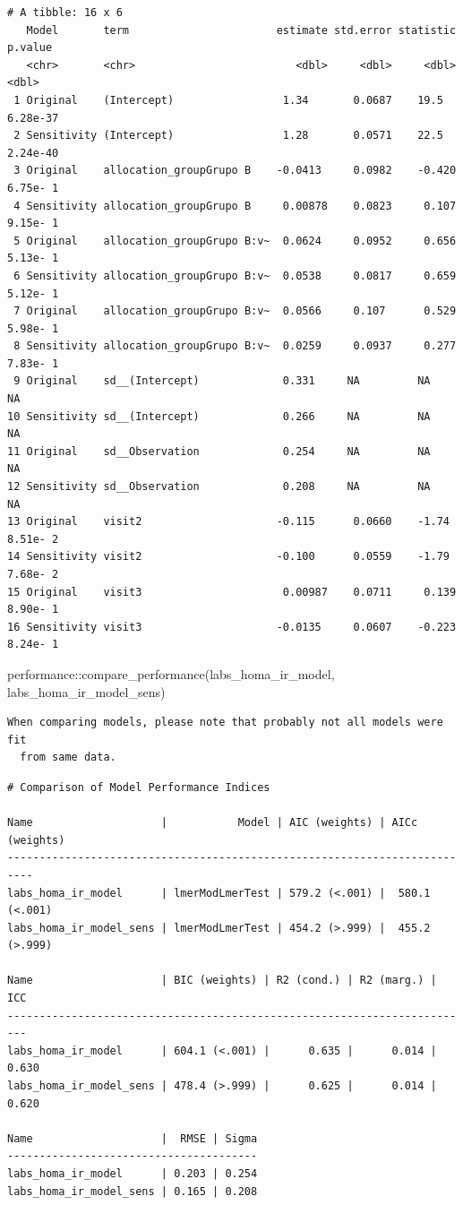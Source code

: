 \documentclass[
  letterpaper,
  DIV=11,
  numbers=noendperiod]{scrartcl}
\newenvironment{Shaded}{\begin{snugshade}}{\end{snugshade}}
\newcommand{\FunctionTok}[1]{\textcolor[rgb]{0.28,0.35,0.67}{#1}}
\newcommand{\NormalTok}[1]{\textcolor[rgb]{0.00,0.23,0.31}{#1}}
\newcommand{\SpecialCharTok}[1]{\textcolor[rgb]{0.37,0.37,0.37}{#1}}
\begin{document}
\begin{verbatim}
# A tibble: 16 x 6
   Model       term                       estimate std.error statistic   p.value
   <chr>       <chr>                         <dbl>     <dbl>     <dbl>     <dbl>
 1 Original    (Intercept)                 1.34       0.0687    19.5    6.28e-37
 2 Sensitivity (Intercept)                 1.28       0.0571    22.5    2.24e-40
 3 Original    allocation_groupGrupo B    -0.0413     0.0982    -0.420  6.75e- 1
 4 Sensitivity allocation_groupGrupo B     0.00878    0.0823     0.107  9.15e- 1
 5 Original    allocation_groupGrupo B:v~  0.0624     0.0952     0.656  5.13e- 1
 6 Sensitivity allocation_groupGrupo B:v~  0.0538     0.0817     0.659  5.12e- 1
 7 Original    allocation_groupGrupo B:v~  0.0566     0.107      0.529  5.98e- 1
 8 Sensitivity allocation_groupGrupo B:v~  0.0259     0.0937     0.277  7.83e- 1
 9 Original    sd__(Intercept)             0.331     NA         NA     NA       
10 Sensitivity sd__(Intercept)             0.266     NA         NA     NA       
11 Original    sd__Observation             0.254     NA         NA     NA       
12 Sensitivity sd__Observation             0.208     NA         NA     NA       
13 Original    visit2                     -0.115      0.0660    -1.74   8.51e- 2
14 Sensitivity visit2                     -0.100      0.0559    -1.79   7.68e- 2
15 Original    visit3                      0.00987    0.0711     0.139  8.90e- 1
16 Sensitivity visit3                     -0.0135     0.0607    -0.223  8.24e- 1
\end{verbatim}

\begin{Shaded}
\begin{Highlighting}[]
\NormalTok{performance}\SpecialCharTok{::}\FunctionTok{compare\_performance}\NormalTok{(labs\_homa\_ir\_model, labs\_homa\_ir\_model\_sens)}
\end{Highlighting}
\end{Shaded}

\begin{verbatim}
When comparing models, please note that probably not all models were fit
  from same data.
\end{verbatim}

\begin{verbatim}
# Comparison of Model Performance Indices

Name                    |           Model | AIC (weights) | AICc (weights)
--------------------------------------------------------------------------
labs_homa_ir_model      | lmerModLmerTest | 579.2 (<.001) |  580.1 (<.001)
labs_homa_ir_model_sens | lmerModLmerTest | 454.2 (>.999) |  455.2 (>.999)

Name                    | BIC (weights) | R2 (cond.) | R2 (marg.) |   ICC
-------------------------------------------------------------------------
labs_homa_ir_model      | 604.1 (<.001) |      0.635 |      0.014 | 0.630
labs_homa_ir_model_sens | 478.4 (>.999) |      0.625 |      0.014 | 0.620

Name                    |  RMSE | Sigma
---------------------------------------
labs_homa_ir_model      | 0.203 | 0.254
labs_homa_ir_model_sens | 0.165 | 0.208
\end{verbatim}
\end{document}
